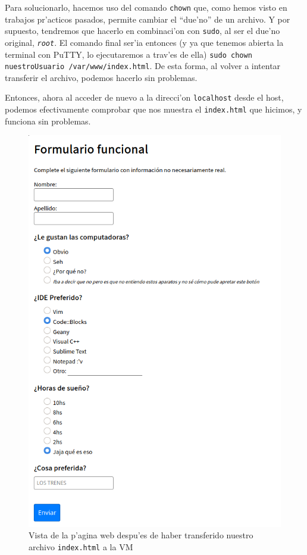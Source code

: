 \documentclass[11pt]{article}
\begin{document}
	Para solucionarlo, hacemos uso del comando \texttt{chown} que, como hemos visto en trabajos pr'acticos pasados, permite cambiar el ``due'no'' de un archivo. Y por supuesto, tendremos que hacerlo en combinaci'on con \texttt{sudo}, al ser el due'no original, \texttt{\emph{root}}. El comando final ser'ia entonces (y ya que tenemos abierta la terminal con PuTTY, lo ejecutaremos a trav'es de ella)  \verb|sudo chown nuestroUsuario /var/www/index.html|. De esta forma, al volver a intentar transferir el archivo, podemos hacerlo sin problemas.
	
	Entonces, ahora al acceder de nuevo a la direcci'on \texttt{localhost} desde el host, podemos efectivamente comprobar que nos muestra el \texttt{index.html} que hicimos, y funciona sin problemas.
	
	\begin{figure}[H]
		\centering \captionsetup{justification=centering}
		\includegraphics[width=.8\linewidth]{Images/WinSCP/fig5}
		\caption{Vista de la p'agina web despu'es de haber transferido nuestro archivo \texttt{index.html} a la VM}
	\end{figure}
\end{document}
